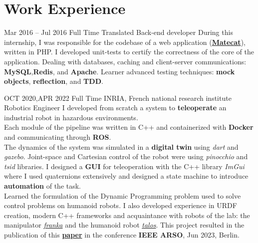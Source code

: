 \documentclass[
	12pt, %
]{../templates/FreemanCV}
\begin{document}
\section{Work Experience}
\jobentry
	{Mar 2016 -- Jul 2016} %
	{Full Time} %
	{Translated} %
	{Back-end developer} %
	{
    During this internship, I was responsible for the codebase of a web application (\href{https://www.matecat.com/}{\textbf{Matecat}}), written in PHP.
    I developed unit-tests to certify the correctness of the core of the application.
    Dealing with databases, caching and client-server communications: \textbf{MySQL},\textbf{Redis}, and \textbf{Apache}.
    Learner advanced testing techniques: \textbf{mock objects}, \textbf{reflection}, and \textbf{TDD}.
  }

\newpage
\jobentry
	{OCT 2020,APR 2022} %
	{Full Time} %
  {INRIA, French national research institute} %
	{Robotics Engineer} %
	{
    I developed from scratch a system to \textbf{teleoperate} an industrial robot in hazardous environments.\\
    Each module of the pipeline was written in C++ and containerized with \textbf{Docker} and communicating through \textbf{ROS}.\\
    The dynamics of the system was simulated in a \textbf{digital twin} using \textit{dart} and \textit{gazebo}.
    Joint-space and Cartesian control of the robot were using \textit{pinocchio} and \textit{tsid} libraries.
    I designed a \textbf{GUI} for teleoperation with the C++ library \textit{ImGui}
    where I used quaternions extensively and designed a state machine to introduce \textbf{automation} of the task.\\
    Learned the formulation of the Dynamic Programming problem used to solve control problems on humanoid robots.
    I also developed experience in URDF creation, modern C++ frameworks and
    acquaintance with robots of the lab: the manipulator  \href{https://www.franka.de/}{\textit{franka}}
    and the humanoid robot \href{https://pal-robotics.com/robots/talos/}{\textit{talos}}.
    This project resulted in the publication of this \href{https://hal.laas.fr/LORIA-AIS/hal-03996168v2}{\textbf{paper}}
    in the conference \textbf{IEEE ARSO}, Jun 2023, Berlin.
  }
\end{document}

